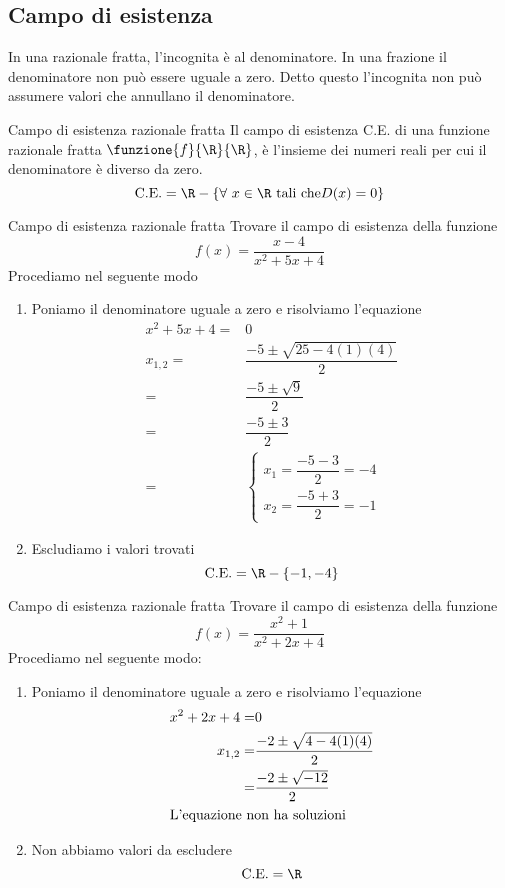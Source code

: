 \subsection{Campo di esistenza}
In una razionale fratta, l'incognita è al denominatore. In una frazione il denominatore non può essere uguale a zero. Detto questo l'incognita non può assumere valori che annullano il denominatore.
\begin{definizionet}{Campo di esistenza razionale fratta}{}
	Il campo di esistenza C.E. di una funzione razionale fratta 
	$\funzione{f}{\R}{\R}$, è  l'insieme dei numeri reali per cui il 
	denominatore è diverso da zero.
	\[\text{C.E.}=\R-\lbrace\forall\ x\in\R\ \text{tali che} D(x)= 0\rbrace\]
\end{definizionet}
\begin{esempiot}{Campo di esistenza razionale fratta}{}
	Trovare il campo di esistenza della funzione\[f(x)=\dfrac{x-4}{x^2+5x+4}\]
	Procediamo nel  seguente modo
	\begin{enumerate}
		\item Poniamo il denominatore uguale a zero e risolviamo l'equazione\begin{align*}
		x^2+5x+4=&0\\
		x_{1,2}=&\dfrac{-5\pm\sqrt{25-4(1)(4)}}{2}\\
		=&\dfrac{-5\pm\sqrt{9}}{2}\\
		=&\dfrac{-5\pm 3}{2}\\
		=&\begin{cases}
		x_1=\dfrac{-5-3}{2}=-4\\
		x_2=\dfrac{-5+3}{2}=-1
		\end{cases}
		\end{align*}
		\item Escludiamo i valori trovati\[\text{C.E.}=\R-\lbrace -1,-4\rbrace\]
	\end{enumerate}
\end{esempiot}
\begin{esempiot}{Campo di esistenza razionale fratta}{}
	Trovare il campo di esistenza della funzione\[f(x)=\dfrac{x^2+1}{x^2+2x+4}\]
	Procediamo nel  seguente modo:
	\begin{enumerate}
		\item Poniamo il denominatore uguale a zero e risolviamo l'equazione\begin{align*}
		x^2+2x+4=&0\\
		x_{1,2}=&\dfrac{-2\pm\sqrt{4-4(1)(4)}}{2}\\
		=&\dfrac{-2\pm\sqrt{-12}}{2}\\
	\intertext{L'equazione non ha soluzioni}
		\end{align*}
		\item Non abbiamo valori da escludere\[\text{C.E.}=\R\]
	\end{enumerate}
\end{esempiot}
